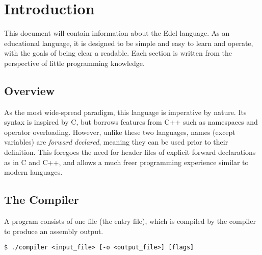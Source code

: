 \section{Introduction}\label{sec:introduction}

This document will contain information about the Edel language.
As an educational language, it is designed to be simple and easy to learn and operate, with the goals of being clear a readable.
Each section is written from the perspective of little programming knowledge.

\subsection{Overview}\label{subsec:overview}

As the most wide-spread paradigm, this language is imperative by nature.
Its syntax is inspired by C, but borrows features from C++ such as namespaces and operator overloading.
However, unlike these two languages, names (except variables) are \textit{forward declared}, meaning they can be used prior to their definition.
This foregoes the need for header files of explicit forward declarations as in C and C++, and allows a much freer programming experience similar to modern languages.


\subsection{The Compiler}\label{subsec:the-compiler}

A program consists of one file (the entry file), which is compiled by the compiler to produce an assembly output.

\medskip
\begin{lstlisting}[style=bashconsole]
$ ./compiler <input_file> [-o <output_file>] [flags]
\end{lstlisting}
\medskip

